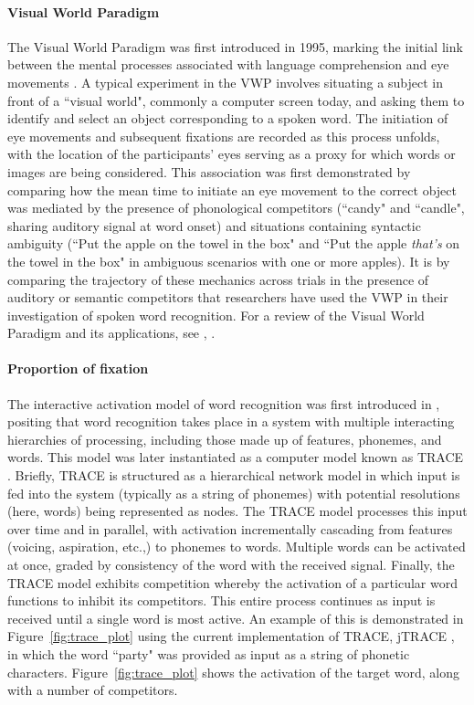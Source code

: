 \paragraph{Visual World Paradigm} The Visual World Paradigm  was first introduced in 1995, marking the initial link between the mental processes associated with language comprehension and eye movements \citep{tanenhaus1995integration}. A typical experiment in the VWP involves situating a subject in front of a ``visual world", commonly a computer screen today, and asking them to identify and select an object corresponding to a spoken word. The initiation of eye movements and subsequent fixations are recorded as this process unfolds, with the location of the participants' eyes serving as a proxy for which words or images are being considered. This association was first demonstrated by comparing how the mean time to initiate an eye movement to the correct object was mediated by the presence of phonological competitors (``candy" and ``candle", sharing auditory signal at word onset) and situations containing syntactic ambiguity (``Put the apple on the towel in the box" and ``Put the apple \textit{that's} on the towel in the box" in ambiguous scenarios with one or more apples). It is by comparing the trajectory of these mechanics across trials in the presence of auditory or semantic competitors that researchers have used the VWP in their investigation of spoken word recognition. For a review of the Visual World Paradigm and its applications, see \citet{Huettig2011}, \citet{salverda2017visual}.




\paragraph{Proportion of fixation} The interactive activation model of word recognition was first introduced in \citet{McClelland1981}, positing that word recognition takes place in a system with multiple interacting hierarchies of processing, including those made up of features, phonemes, and words. This model was later instantiated as a computer model known as TRACE \citep{elman1985speech}. Briefly, TRACE is structured as a hierarchical network model in which input is fed into the system (typically as a string of phonemes) with potential resolutions (here, words) being represented as nodes. The TRACE model processes this input over time and in parallel, with activation incrementally cascading from features (voicing, aspiration, etc.,) to phonemes to words. Multiple words can be activated at once, graded by consistency of the word with the received signal. Finally, the TRACE model exhibits competition whereby the activation of a particular word functions to inhibit its competitors. This entire process continues as input is received until a single word is most active. An example of this is demonstrated in Figure~\ref{fig:trace_plot} using the current implementation of TRACE, jTRACE \citep{Strauss2007}, in which the word ``party" was provided as input as a string of phonetic characters. Figure~\ref{fig:trace_plot} shows the activation of the target word, along with a number of competitors.

